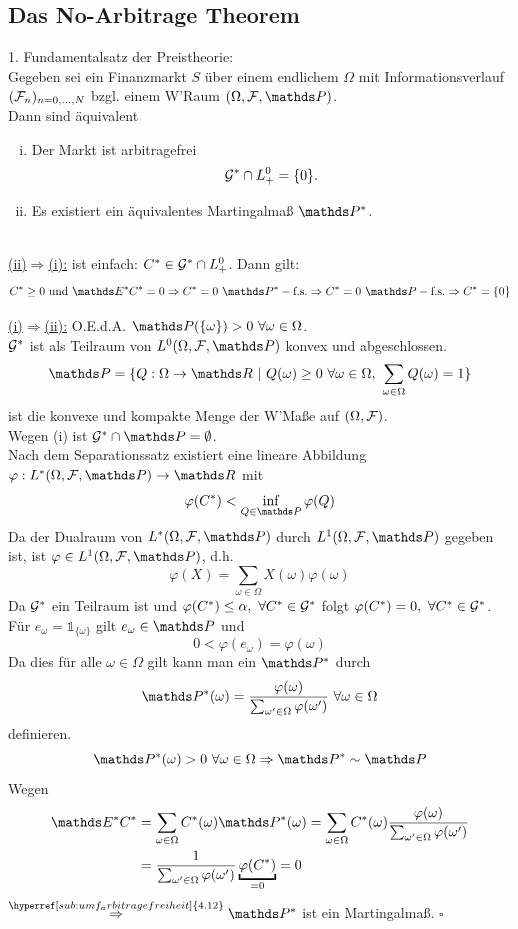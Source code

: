\subsection{Das No-Arbitrage Theorem}
\label{sub:no-arbitrage_theorem}
1. Fundamentalsatz der Preistheorie:\\
Gegeben sei ein Finanzmarkt $S$ über einem endlichem $\Omega$ mit Informationsverlauf $(\mathcal{F}_n)_{n=0,\dots,N}$ bzgl. einem W'Raum $(\Omega,\F,\Pw)$.\\
Dann sind äquivalent
\begin{enumerate}[(i)]
	\item Der Markt ist arbitragefrei
	\[
	\mathcal{G}^*\cap L_+^0=\{0\}.
	\]
	\item Es existiert ein äquivalentes Martingalmaß $\Pw^*$.
\end{enumerate}

\\
\uline{(ii)$\Rightarrow$(i):}
ist einfach: $C^*\in\mathcal{G}^*\cap L_+^0$.
Dann gilt:
\[
C^*\ge 0\text{ und } \E^*C^*=0\Rightarrow C^*=0~ \Pfs[*]\Rightarrow C^*=0~ \Pfs \Rightarrow C^*=\{0\}
\]

\uline{(i)$\Rightarrow$(ii):}
O.E.d.A. $\Pw(\{\omega\})>0~\forall \omega\in \Omega$.\\
$\mathcal{G}^*$ ist als Teilraum von $L^0(\Omega,\F,\Pw)$ konvex und abgeschlossen.
\[
\Pw=\{Q:\Omega\to \R~|~Q(\omega)\ge 0~\forall \omega\in \Omega,~\sum_{\omega\in \Omega}Q(\omega)=1 \}
\]
ist die konvexe und kompakte Menge der W'Maße auf $(\Omega,\mathcal{F})$.\\
Wegen (i) ist $\G^*\cap\Pw=\emptyset$.\\
Nach dem Separationssatz existiert eine lineare Abbildung $\varphi:L^*(\Omega,\F,\Pw)\to \R$ mit
\[
\varphi(C^*)<\inf\limits_{Q\in \Pw}\varphi(Q)
\]
Da der Dualraum von $L^*(\Omega,\F,\Pw)$ durch $L^1(\Omega,\F,\Pw)$ gegeben ist, ist $\varphi\in L^1(\Omega,\F,\Pw)$, d.h.
\[
\varphi(X)=\sum_{\omega\in \Omega} X(\omega)\varphi(\omega)
\]
Da $\mathcal{G}^*$ ein Teilraum ist und $\varphi(C^*)\le \alpha,~\forall C^*\in \mathcal{G}^*$ folgt $\varphi(C^*)=0,~\forall C^*\in \mathcal{G}^*$.\\
Für $e_\omega=\mathbb{1}_{\{\omega\}}$ gilt $e_\omega\in \Pw$ und
\[
0<\varphi(e_\omega)=\varphi(\omega)
\]
Da dies für alle $\omega\in\Omega$ gilt kann man ein $\Pw^*$ durch
\[
\Pw^*(\omega)=\frac{\varphi(\omega)}{\sum_{\omega'\in\Omega}\varphi(\omega')}~\forall \omega\in\Omega
\]
definieren.
\[
\Pw^*(\omega)>0~\forall \omega\in\Omega \Rightarrow \Pw^*\sim \Pw
\]
Wegen
\begin{equation*}
\begin{aligned}
\E^*C^* &= \sum_{\omega\in\Omega}C^*(\omega)\Pw^*(\omega) = \sum_{\omega\in \Omega}C^*(\omega)\frac{\varphi(\omega)}{\sum_{\omega'\in\Omega}\varphi(\omega')}\\
&= \frac{1}{\sum_{\omega'\in\Omega}\varphi(\omega')}\underbracket{\varphi(C^*)}_{=0}=0
\end{aligned}
\end{equation*}
$\stackrel{\hyperref[sub:umf_arbitragefreiheit]{4.12}}{\Rightarrow} \Pw^*$ ist ein Martingalmaß.
\hfill $\square$

